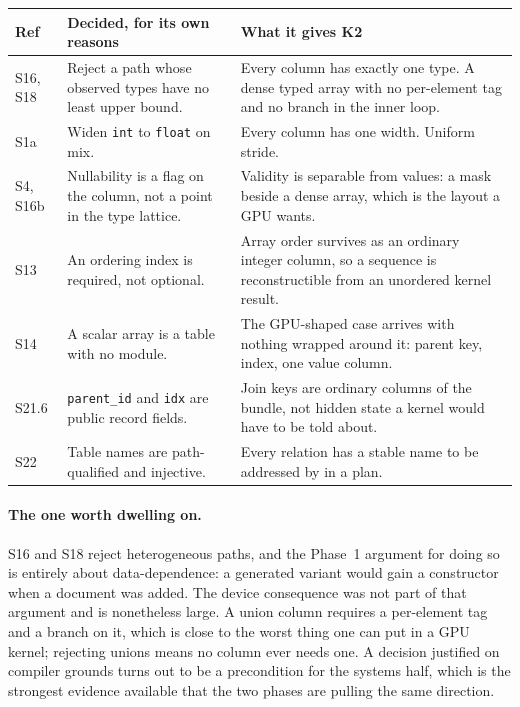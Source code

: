 \documentclass[11pt,a4paper]{article}
\begin{document}
\begin{center}
\begin{tabular}{@{}lp{5.0cm}p{5.4cm}@{}}
\hline
\textbf{Ref} & \textbf{Decided, for its own reasons} & \textbf{What it gives K2} \\
\hline
S16, S18 & Reject a path whose observed types have no least upper bound.
  & Every column has exactly one type. A dense typed array with no per-element
    tag and no branch in the inner loop. \\
S1a & Widen \texttt{int} to \texttt{float} on mix.
  & Every column has one width. Uniform stride. \\
S4, S16b & Nullability is a flag on the column, not a point in the type
    lattice.
  & Validity is separable from values: a mask beside a dense array, which is
    the layout a GPU wants. \\
S13 & An ordering index is required, not optional.
  & Array order survives as an ordinary integer column, so a sequence is
    reconstructible from an unordered kernel result. \\
S14 & A scalar array is a table with no module.
  & The GPU-shaped case arrives with nothing wrapped around it: parent key,
    index, one value column. \\
S21.6 & \texttt{parent\_id} and \texttt{idx} are public record fields.
  & Join keys are ordinary columns of the bundle, not hidden state a kernel
    would have to be told about. \\
S22 & Table names are path-qualified and injective.
  & Every relation has a stable name to be addressed by in a plan. \\
\hline
\end{tabular}
\end{center}

\paragraph{The one worth dwelling on.} S16 and S18 reject heterogeneous paths,
and the Phase~1 argument for doing so is entirely about data-dependence: a
generated variant would gain a constructor when a document was added. The
device consequence was not part of that argument and is nonetheless large. A
union column requires a per-element tag and a branch on it, which is close to
the worst thing one can put in a GPU kernel; rejecting unions means no column
ever needs one. A decision justified on compiler grounds turns out to be a
precondition for the systems half, which is the strongest evidence available
that the two phases are pulling the same direction.
\end{document}
